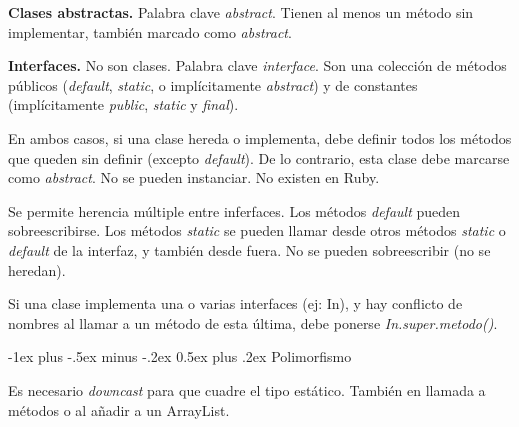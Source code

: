\documentclass[10pt,a4paper,landscape]{article}
\makeatletter
\renewcommand{\section}{\@startsection{section}{1}{0mm}%
                                {-1ex plus -.5ex minus -.2ex}%
                                {0.5ex plus .2ex}%
                                {\normalfont\large\bfseries}}
\makeatother
\begin{document}
\begin{multicols}{3}
\textbf{Clases abstractas.} Palabra clave \textit{abstract}. Tienen al menos un método sin implementar, también marcado como \textit{abstract}.

\textbf{Interfaces.} No son clases. Palabra clave \textit{interface}. Son una colección de métodos públicos (\textit{default}, \textit{static}, o implícitamente \textit{abstract}) y de constantes (implícitamente \textit{public}, \textit{static} y \textit{final}).

En ambos casos, si una clase hereda o implementa, debe definir todos los métodos que queden sin definir (excepto \textit{default}). De lo contrario, esta clase debe marcarse como \textit{abstract}. No se pueden instanciar. No existen en Ruby.

Se permite herencia múltiple entre inferfaces. Los métodos \textit{default} pueden sobreescribirse. Los métodos \textit{static} se pueden llamar desde otros métodos \textit{static} o \textit{default} de la interfaz, y también desde fuera. No se pueden sobreescribir (no se heredan).

Si una clase implementa una o varias interfaces (ej: In),  y hay conflicto de nombres al llamar a un método de esta última, debe ponerse \textit{In.super.metodo()}.

\section{Polimorfismo}

Es necesario \textit{downcast} para que cuadre el tipo estático. También en llamada a métodos o al añadir a un ArrayList.



\end{multicols}
\end{document}
